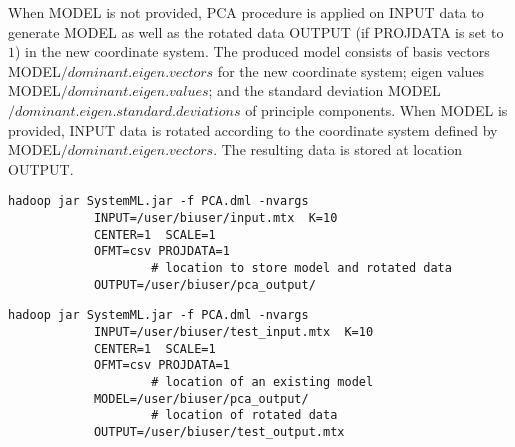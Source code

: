 When MODEL is not provided, PCA procedure is applied on INPUT data to generate MODEL as well as the rotated data OUTPUT (if PROJDATA is set to $1$) in the new coordinate system. 
The produced model consists of basis vectors MODEL$/dominant.eigen.vectors$ for the new coordinate system; eigen values MODEL$/dominant.eigen.values$; and the standard deviation MODEL$/dominant.eigen.standard.deviations$ of principle components.
When MODEL is provided, INPUT data is rotated according to the coordinate system defined by MODEL$/dominant.eigen.vectors$. The resulting data is stored at location OUTPUT.
\\


\begin{verbatim}
hadoop jar SystemML.jar -f PCA.dml -nvargs 
            INPUT=/user/biuser/input.mtx  K=10
            CENTER=1  SCALE=1
            OFMT=csv PROJDATA=1
				    # location to store model and rotated data
            OUTPUT=/user/biuser/pca_output/   
\end{verbatim}

\begin{verbatim}
hadoop jar SystemML.jar -f PCA.dml -nvargs 
            INPUT=/user/biuser/test_input.mtx  K=10
            CENTER=1  SCALE=1
            OFMT=csv PROJDATA=1
				    # location of an existing model
            MODEL=/user/biuser/pca_output/       
				    # location of rotated data
            OUTPUT=/user/biuser/test_output.mtx  
\end{verbatim}



